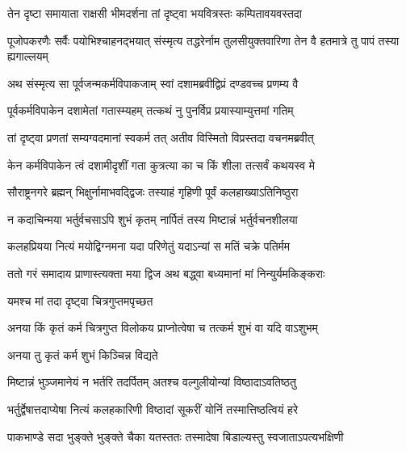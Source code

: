 \twolineshloka
{तेन दृष्टा समायाता राक्षसी भीमदर्शना}
{तां दृष्ट्वा भयवित्रस्तः कम्पितावयवस्तदा} %

\threelineshloka
{पूजोपकरणैः सर्वैः पयोभिश्चाहनद्भयात्}
{संस्मृत्य तद्धरेर्नाम तुलसीयुक्तवारिणा}
{तेन वै हतमात्रे तु पापं तस्या ह्यगाल्लयम्} %

\twolineshloka
{अथ संस्मृत्य सा पूर्वजन्मकर्मविपाकजाम्}
{स्वां दशामब्रवीद्विप्रं दण्डवच्च प्रणम्य वै} %


\twolineshloka
{पूर्वकर्मविपाकेन दशामेतां गतास्म्यहम्}
{तत्कथं नु पुनर्विप्र प्रयास्याम्युत्तमां गतिम्} %


\twolineshloka
{तां दृष्ट्वा प्रणतां सम्यग्वदमानां स्वकर्म तत्}
{अतीव विस्मितो विप्रस्तदा वचनमब्रवीत्} %

\twolineshloka
{केन कर्मविपाकेन त्वं दशामीदृशीं गता}
{कुत्रत्या का च किं शीला तत्सर्वं कथयस्व मे} %


\twolineshloka
{सौराष्ट्रनगरे ब्रह्मन् भिक्षुर्नामाभवद्द्विजः}
{तस्याहं गृहिणी पूर्वं कलहाख्याऽतिनिष्ठुरा} %

\twolineshloka
{न कदाचिन्मया भर्तुर्वचसाऽपि शुभं कृतम्}
{नार्पितं तस्य मिष्टान्नं भर्तुर्वचनशीलया} %

\twolineshloka
{कलहप्रियया नित्यं मयोद्विग्नमना यदा}
{परिणेतुं यदाऽन्यां स मतिं चक्रे पतिर्मम} %

\twolineshloka
{ततो गरं समादाय प्राणास्त्यक्ता मया द्विज}
{अथ बद्ध्वा बध्यमानां मां निन्युर्यमकिङ्कराः} %


\onelineshloka
{यमश्च मां तदा दृष्ट्वा चित्रगुप्तमपृच्छत} %


\twolineshloka
{अनया किं कृतं कर्म चित्रगुप्त विलोकय}
{प्राप्नोत्वेषा च तत्कर्म शुभं वा यदि वाऽशुभम्} %





\onelineshloka
{अनया तु कृतं कर्म शुभं किञ्चिन्न विद्यते} %

\twolineshloka
{मिष्टान्नं भुञ्जमानेयं न भर्तरि तदर्पितम्}
{अतश्च वल्गुलीयोन्यां विष्ठादाऽवतिष्ठतु} %

\twolineshloka
{भर्तुर्द्वेषात्तदाप्येषा नित्यं कलहकारिणी}
{विष्ठादां सूकरीं योनिं तस्मात्तिष्ठत्वियं हरे} %

\twolineshloka
{पाकभाण्डे सदा भुङ्क्ते भुङ्क्ते चैका यतस्ततः}
{तस्मादेषा बिडाल्यस्तु स्वजाताऽपत्यभक्षिणी} %

